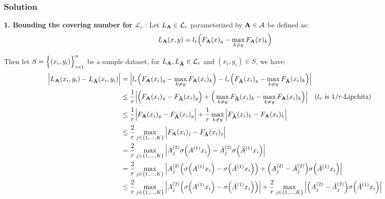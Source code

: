 \subsubsection{Solution}

\textbf{1. Bounding the covering number for $\mathcal{L}_r$} : Let $L_{\bf A} \in \mathcal{L}_r$ parameterized by ${\bf A}\in\mathcal{A}$ be defined as:
\begin{align*}
    L_{\bf A}(x, y) = l_r\Big( 
        F_{\bf A}(x)_y - \max_{k\ne y} F_{\bf A}(x)_k
     \Big)
\end{align*}

\noindent Then let $S=\Big\{ (x_i, y_i) \Big\}_{i=1}^n$ be a sample dataset, for $L_{\bf A}, L_{\bf \bar A}\in\mathcal{L}_r$ and $(x_i, y_i)\in S$, we have:
\begin{align*}
    \Big| L_{\bf A}(x_i, y_i) - L_{\bf \bar A}(x_i, y_i) \Big| &= \Big| 
        l_r\Big( 
            F_{\bf A}(x_i)_y - \max_{k\ne y} F_{\bf A}(x_i)_k
         \Big) - 
        l_r\Big( 
            F_{\bf \bar A}(x_i)_y - \max_{k\ne y} F_{\bf \bar A}(x_i)_k
         \Big)
     \Big| \\
    &\le \frac{1}{r} \Big| 
        \Big( F_{\bf A}(x_i)_y - F_{\bf \bar A}(x_i)_y \Big) +
        \Big( 
            \max_{k\ne y} F_{\bf \bar A}(x_i)_k - \max_{k\ne y} F_{\bf A}(x_i)_k
         \Big)
     \Big| \ \ \ \text{($l_r$ is $1/r$-Lipchitz)} \\
    &\le \frac{1}{r} \Big| 
        F_{\bf A}(x_i)_y - F_{\bf \bar A}(x_i)_y
     \Big| + \frac{1}{r}\max_{k\ne y}\Big| 
        F_{\bf \bar A}(x_i)_k - F_{\bf A}(x_i)_k
     \Big| \\
    &\le \frac{2}{r}\max_{j\in\{1, \dots, K\}} \Big| F_{\bf A}(x_i)_j - F_{\bf \bar A}(x_i)_j \Big| \\
    &= \frac{2}{r}\max_{j\in\{1, \dots, K\}} \Big| 
        A^{(2)}_j\sigma\Big( A^{(1)}x_i \Big) - \bar A^{(2)}_j\sigma\Big( \bar A^{(1)}x_i \Big)
     \Big| \\
    &= \frac{2}{r}\max_{j\in\{1, \dots, K\}} \Big| 
        A_j^{(2)}\Big( \sigma\Big( A^{(1)}x_i \Big) - \sigma\Big( \bar A^{(1)}x_i \Big) \Big)
        + \Big( A_j^{(2)} - \bar A_j^{(2)} \Big)\sigma\Big( \bar A^{(1)}x_i \Big) 
     \Big| \\
    &\le \frac{2}{r}\max_{j\in\{1, \dots, K\}}\Big| 
        A_j^{(2)}\Big( \sigma\Big( A^{(1)}x_i \Big) - \sigma\Big( \bar A^{(1)}x_i \Big) \Big)
     \Big| + \frac{2}{r}\max_{j\in\{1, \dots, K\}}\Big| 
        \Big( A_j^{(2)} - \bar A_j^{(2)} \Big)\sigma\Big( \bar A^{(1)}x_i \Big) 
     \Big|
\end{align*}

